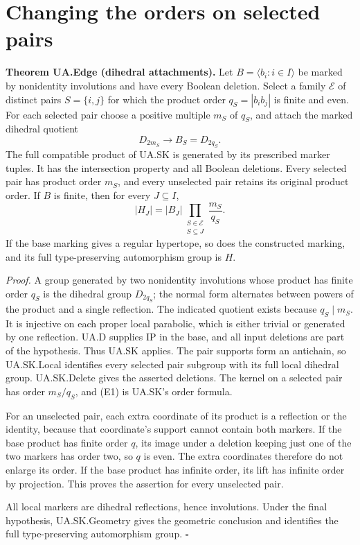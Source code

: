 \section{Changing the orders on selected pairs}\label{changing-the-orders-on-selected-pairs}

\textbf{Theorem UA.Edge (dihedral attachments).} Let
\(B=\langle b_i:i\in I\rangle\) be marked by nonidentity involutions and
have every Boolean deletion. Select a family \(\mathcal E\) of distinct
pairs \(S=\{i,j\}\) for which the product order \(q_S=|b_i b_j|\) is
finite and even. For each selected pair choose a positive multiple
\(m_S\) of \(q_S\), and attach the marked dihedral quotient \[
D_{2m_S}\longrightarrow B_S=D_{2q_S}.
\] The full compatible product of UA.SK is generated by its prescribed
marker tuples. It has the intersection property and all Boolean
deletions. Every selected pair has product order \(m_S\), and every
unselected pair retains its original product order. If \(B\) is finite,
then for every \(J\subseteq I\), \[
|H_J|=|B_J|\prod_{\substack{S\in\mathcal E\\S\subseteq J}}\frac{m_S}{q_S}.
\tag{E1}
\] If the base marking gives a regular hypertope, so does the
constructed marking, and its full type-preserving automorphism group is
\(H\).

\emph{Proof.} A group generated by two nonidentity involutions whose
product has finite order \(q_S\) is the dihedral group \(D_{2q_S}\); the
normal form alternates between powers of the product and a single
reflection. The indicated quotient exists because \(q_S\mid m_S\). It is
injective on each proper local parabolic, which is either trivial or
generated by one reflection. UA.D supplies IP in the base, and all input
deletions are part of the hypothesis. Thus UA.SK applies. The pair
supports form an antichain, so UA.SK.Local identifies every selected
pair subgroup with its full local dihedral group. UA.SK.Delete gives the
asserted deletions. The kernel on a selected pair has order \(m_S/q_S\),
and (E1) is UA.SK's order formula.

For an unselected pair, each extra coordinate of its product is a
reflection or the identity, because that coordinate's support cannot
contain both markers. If the base product has finite order \(q\), its
image under a deletion keeping just one of the two markers has order
two, so \(q\) is even. The extra coordinates therefore do not enlarge
its order. If the base product has infinite order, its lift has infinite
order by projection. This proves the assertion for every unselected
pair.

All local markers are dihedral reflections, hence involutions. Under the
final hypothesis, UA.SK.Geometry gives the geometric conclusion and
identifies the full type-preserving automorphism group. \(\square\)

